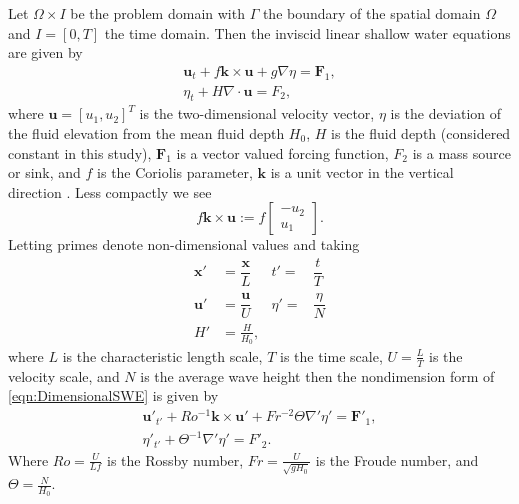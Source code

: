 Let $\Omega \times I$ be the problem domain with $\Gamma$ the boundary of the
spatial domain $\Omega$ and $I = [0, T]$ the time domain.  Then the inviscid
linear shallow water equations are given by
\begin{equation}
  \begin{split}
    \mathbf{u}_t + f\mathbf{k} \times \mathbf{u} + g \nabla \eta = \mathbf{F}_1, \\
    \eta_t + H \nabla\cdot \mathbf{u} = F_2,
  \end{split}
  \label{eqn:DimensionalSWE}
\end{equation}
where $\mathbf{u}=[u_1,u_2]^T$ is the two-dimensional velocity vector, $\eta$ is the
deviation of the fluid elevation from the mean fluid depth $H_0$, $H$ is the
fluid depth (considered constant in this study), $\mathbf{F}_1$ is a vector valued
forcing function, $F_2$ is a mass source or sink, and $f$ is the Coriolis
parameter, $\mathbf{k}$ is a unit vector in the vertical direction
\cite{Hanert2004, LeBlond1981, Le-Roux1998}.  Less compactly we see
\begin{equation}
  f\mathbf{k} \times \mathbf{u} := f\begin{bmatrix}
    -u_2 \\
    u_1
  \end{bmatrix}.
  \label{eqn:Coriolis}
\end{equation}
Letting primes denote non-dimensional values and taking
\begin{align*}
    \mathbf{x}' &= \dfrac{\mathbf{x}}{L} &t' =& \dfrac{t}{T} \\[1em]
    \mathbf{u}' &= \dfrac{\mathbf{u}}{U} &\eta' =& \dfrac{\eta}{N} \\[1em]
    H' &= \frac{H}{H_0},
\end{align*}
where $L$ is the characteristic length scale, $T$ is the time scale,
$U=\frac{L}{T}$ is the velocity scale, and $N$ is the average wave height then
the nondimension form of \eqref{eqn:DimensionalSWE} is given by
\begin{equation}
  \begin{split}
    \mathbf{u}'_{t'} + Ro^{-1} \mathbf{k}\times\mathbf{u}' 
        + Fr^{-2} \Theta \nabla' \eta' = \mathbf{F}'_1, \\
      \eta'_{t'} + \Theta^{-1} \nabla' \eta' = F'_2.
  \end{split}
  \label{eqn:NondimensionalSWE}
\end{equation}
Where $Ro = \frac{U}{Lf}$ is the Rossby number, $Fr = \frac{U}{\sqrt{gH_0}}$ is
the Froude number, and $\Theta = \frac{N}{H_0}$.
